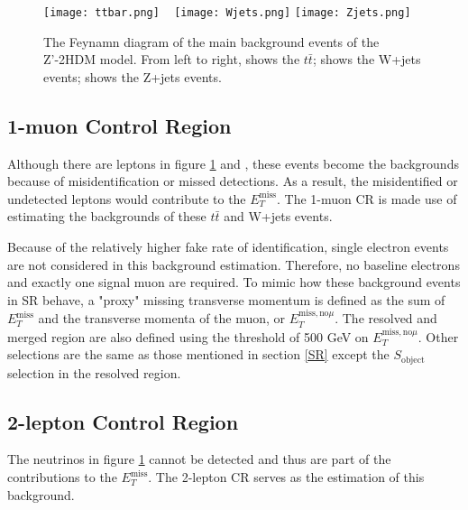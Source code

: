 \documentclass[class=NCU_thesis, crop=false]{standalone}
\begin{document}
	\begin{figure}[!hbt]
		\centering
		\subcaptionbox
		{\label{fig:subfig_ttbar}}
		{\texttt{[image: ttbar.png]}}
		~
		\subcaptionbox
		{\label{fig:subfig_Wjets}}
		{\texttt{[image: Wjets.png]}}
		\subcaptionbox
		{\label{fig:subfig_Zjets}}
		{\texttt{[image: Zjets.png]}}
		\caption{The Feynamn diagram of the main background events of the Z'-2HDM model. From left to right,  shows the $t\bar{t}$;  shows the W+jets events;  shows the Z+jets events.}
		\label{fig:background}
	\end{figure}

	\subsection{1-muon Control Region}
		Although there are leptons in figure \ref{fig:background}  and , these events become the backgrounds because of misidentification or missed detections. As a result, the misidentified or undetected leptons would contribute to the $E_T^{\mathrm{miss}}$. The 1-muon CR is made use of estimating the backgrounds of these $t\bar{t}$ and W+jets events.
	
		Because of the relatively higher fake rate of identification, single electron events are not considered in this background estimation. Therefore, no baseline electrons and exactly one signal muon are required. To mimic how these background events in SR behave, a "proxy" missing transverse momentum is defined as the sum of $E_T^{\mathrm{miss}}$ and the transverse momenta of the muon, or $E_T^{\mathrm{miss, no } \mu}$. The resolved and merged region are also defined using the threshold of 500 GeV on $E_T^{\mathrm{miss, no } \mu}$. Other selections are the same as those mentioned in section \ref{SR} except the $S_{\mathrm{object}}$ selection in the resolved region.
	
	\subsection{2-lepton Control Region}
		The neutrinos in figure \ref{fig:background}  cannot be detected and thus are part of the contributions to the $E_T^{\mathrm{miss}}$. The 2-lepton CR serves as the estimation of this background.
		
\end{document}
